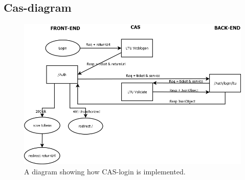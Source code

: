 \subsection{Cas-diagram}
\begin{figure}[H]
\centering
\includegraphics[scale=0.45]{img/login.png}
\caption{A diagram showing how CAS-login is implemented.}
\end{figure}
